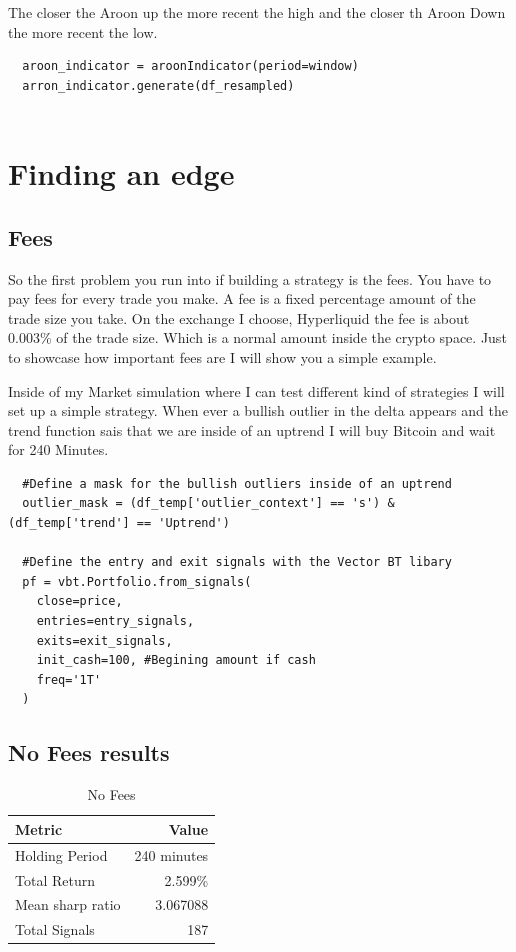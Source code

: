 \documentclass[12pt]{article}
\begin{document}
The closer the Aroon up the more recent the high and the closer th Aroon Down the more recent the low.

\begin{verbatim}
  aroon_indicator = aroonIndicator(period=window)
  arron_indicator.generate(df_resampled)


\end{verbatim}









\newpage
\section{Finding an edge}
\subsection{Fees}
So the first problem you run into if building a strategy is the fees. You have to pay fees for every trade you make. A fee is a fixed percentage amount of the trade size you take. On the exchange I choose, Hyperliquid the fee is about 0.003\% of the trade size. Which is a normal amount inside the crypto space. 
Just to showcase how important fees are I will show you a simple example.

Inside of my Market simulation where I can test different kind of strategies I will set up a simple strategy. When ever a bullish outlier in the delta appears and the trend function sais that we are inside of an uptrend I will buy Bitcoin and wait for 240 Minutes.

\begin{verbatim}
  #Define a mask for the bullish outliers inside of an uptrend 
  outlier_mask = (df_temp['outlier_context'] == 's') & (df_temp['trend'] == 'Uptrend')  
  
  #Define the entry and exit signals with the Vector BT libary
  pf = vbt.Portfolio.from_signals(
    close=price,
    entries=entry_signals,
    exits=exit_signals,
    init_cash=100, #Begining amount if cash
    freq='1T'
  ) 

\end{verbatim}


\subsection{No Fees results}

\begin{table}[H]
  \centering
  \caption{No Fees}
  \label{tab:backtest_results}
  \begin{tabular}{@{}lr@{}}
    \toprule
    Metric & Value \\
    \midrule
    Holding Period & 240 minutes \\
    Total Return & 2.599\% \\
    Mean sharp ratio& 3.067088 \\
    Total Signals & 187 \\
    \bottomrule
  \end{tabular}
\end{table}
\end{document}
